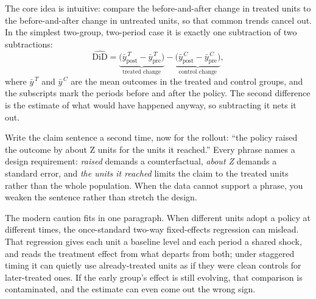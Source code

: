 The core idea is intuitive: compare the before-and-after change in treated units to the before-and-after change in untreated units, so that common trends cancel out. In the simplest two-group, two-period case it is exactly one subtraction of two subtractions:
\[
\widehat{\text{DiD}}
=\underbrace{\big(\bar y^{\,T}_{\text{post}}-\bar y^{\,T}_{\text{pre}}\big)}_{\text{treated change}}
-\underbrace{\big(\bar y^{\,C}_{\text{post}}-\bar y^{\,C}_{\text{pre}}\big)}_{\text{control change}},
\]
where $\bar y^{\,T}$ and $\bar y^{\,C}$ are the mean outcomes in the treated and control groups, and the subscripts mark the periods before and after the policy. The second difference is the estimate of what would have happened anyway, so subtracting it nets it out.

Write the claim sentence a second time, now for the rollout: \enquote{the policy raised the outcome by about Z units for the units it reached.} Every phrase names a design requirement: \emph{raised} demands a counterfactual, \emph{about Z} demands a standard error, and \emph{the units it reached} limits the claim to the treated units rather than the whole population. When the data cannot support a phrase, you weaken the sentence rather than stretch the design.

The modern caution fits in one paragraph. When different units adopt a policy at different times, the once-standard two-way fixed-effects regression can mislead. That regression gives each unit a baseline level and each period a shared shock, and reads the treatment effect from what departs from both; under staggered timing it can quietly use already-treated units as if they were clean controls for later-treated ones. If the early group's effect is still evolving, that comparison is contaminated, and the estimate can even come out the wrong sign.

